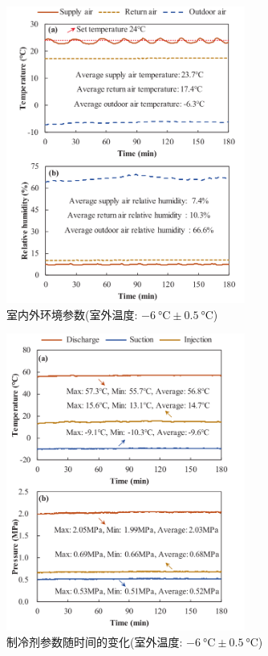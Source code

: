 \begin{figure}[htbp]
	\centering
	\includegraphics[width=0.7\textwidth]{figure/figure_6}
	\caption{室内外环境参数(室外温度: $\qty{-6}{\degreeCelsius}\pm \qty{0.5}{\degreeCelsius}  $)}
	\label{F:6}
\end{figure}

\begin{figure}[htbp]
	\centering
	\includegraphics[width=0.7\textwidth]{figure/figure_7}
	\caption{制冷剂参数随时间的变化(室外温度: $\qty{-6}{\degreeCelsius}\pm \qty{0.5}{\degreeCelsius}  $)}
	\label{F:7}
\end{figure}

